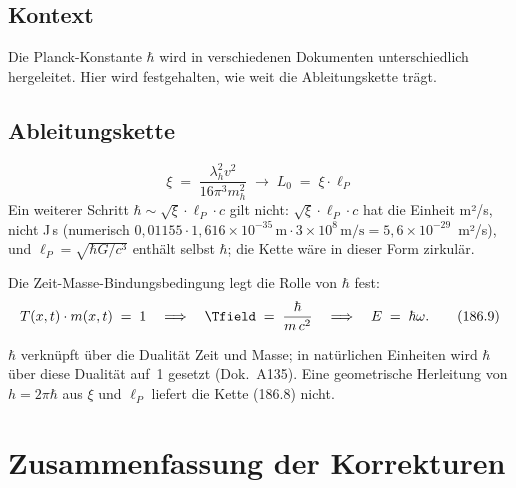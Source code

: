 \subsection*{Kontext}

Die Planck-Konstante $\hbar$ wird in verschiedenen Dokumenten
unterschiedlich hergeleitet. Hier wird festgehalten, wie weit die
Ableitungskette trägt.

\subsection*{Ableitungskette}

\begin{equation}
  \xi \;=\; \frac{\lambda_h^2 v^2}{16\pi^3 m_h^2}
  \;\longrightarrow\;
  L_0 \;=\; \xi \cdot \ell_P
  \tag{186.8}
\end{equation}
Ein weiterer Schritt $\hbar \sim \sqrt{\xi}\cdot \ell_P \cdot c$ gilt nicht:
$\sqrt{\xi}\cdot\ell_P\cdot c$ hat die Einheit m²/s, nicht J\,s (numerisch
$0{,}01155 \cdot 1{,}616\times 10^{-35}\,\text{m} \cdot 3\times 10^{8}\,\text{m/s} = 5{,}6\times 10^{-29}$~m²/s),
und $\ell_P = \sqrt{\hbar G/c^3}$ enthält selbst $\hbar$; die Kette wäre in dieser Form zirkulär.

Die Zeit-Masse-Bindungsbedingung legt die Rolle von $\hbar$ fest:
\begin{equation}
  T(x,t)\cdot m(x,t) \;=\; 1
  \quad\Longrightarrow\quad
  \Tfield \;=\; \frac{\hbar}{m\, c^2}
  \quad\Longrightarrow\quad
  E \;=\; \hbar\omega.
  \tag{186.9}
\end{equation}

$\hbar$ verknüpft über die Dualität Zeit und Masse; in natürlichen
Einheiten wird $\hbar$ über diese Dualität auf~1 gesetzt (Dok.~A135).
Eine geometrische Herleitung von $h = 2\pi\hbar$ aus $\xi$ und $\ell_P$
liefert die Kette (186.8) nicht.

\section*{Zusammenfassung der Korrekturen}

